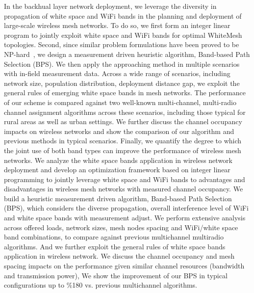 In the backhual layer network deployment, we leverage the diversity 
in propagation of white space and WiFi bands in the planning and deployment
of large-scale wireless mesh networks. To do so, we first form an 
integer linear program to jointly exploit white space and WiFi bands 
for optimal WhiteMesh topologies. Second, since similar problem 
formulations have been proved to be NP-hard~\cite{jain2005impact}, 
we design a measurement driven heuristic algorithm, Band-based Path 
Selection (BPS). We then apply the approaching method in multiple 
scenarios with in-field measurement data. Across a wide range of 
scenarios, including network size, population distribution, deployment 
distance gap, we exploit the general rules of emerging white space 
bands in mesh networks. The performance of our scheme is compared 
against two well-known multi-channel, multi-radio channel assignment 
algorithms across these scenarios, including those typical for rural 
areas as well as urban settings. We further discuss the channel occupancy 
impacts on wireless networks and show the comparison of our algorithm 
and previous methods in typical scenarios. Finally, we quantify the degree 
to which the joint use of both band types can improve the performance of 
wireless mesh networks. We analyze the white space bands application in 
wireless network deployment and develop an optimization framework based 
on integer linear programming to jointly leverage white space and WiFi 
bands to advantages and disadvantages in wireless mesh networks with measured
channel occupancy. We build a heuristic measurement driven algorithm, 
Band-based Path Selection (BPS), which considers the diverse propagation, 
overall interference level of WiFi and white space bands with measurement 
adjust. We perform extensive analysis across offered loads, network sizes, 
mesh nodes spacing and WiFi/white space band combinations, to compare 
against previous multichannel multiradio algorithms. And we further 
exploit the general rules of white space bands application in wireless 
network. We discuss the channel occupancy and mesh spacing impacts on the 
performance given similar channel resources (bandwidth and transmission 
power), We show the improvement of our BPS in typical configurations up to 
\%180 vs. previous multichannel algorithms.

